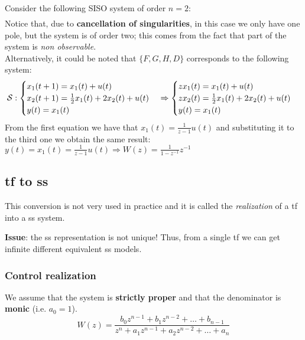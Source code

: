 \begin{exa}{Consider the following SISO system of order $n=2$:}
\begin{align*}
\end{align*}
Notice that, due to \textbf{cancellation of singularities}, in this case we only have one pole, but the system is of order two; this comes from the fact that part of the system is \emph{non observable}.\\
Alternatively, it could be noted that $\{F, G, H, D\}$ corresponds to the following system:
    \[
    \mathcal{S}: 
        \begin{cases}
            x_1(t+1) = x_1(t) + u(t) \\
            x_2(t+1) = \frac{1}{2} x_1(t) + 2x_2(t) + u(t) \\
            y(t) = x_1(t)
        \end{cases}
    \Rightarrow
        \begin{cases}
            zx_1(t) = x_1(t) + u(t) \\
            zx_2(t) = \frac{1}{2} x_1(t) + 2x_2(t) + u(t) \\
            y(t) = x_1(t)
        \end{cases}    
    \]
From the first equation we have that $x_{1}(t)=\frac{1}{z-1}u(t)$ and substituting it to the third one we obtain the same result: $y(t)=x_{1}(t)=\frac{1}{z-1}u(t) \Rightarrow W(z)=\frac{1}{1-z^{-1}} z^{-1}$     

\end{exa}

\subsection{\acrlong{tf} to \acrlong{ss}}
This conversion is not very used in practice and it is called the \emph{realization} of a \acrlong{tf} into a \acrlong{ss} system.

\textbf{Issue}: the \acrlong{ss} representation is not unique! Thus, from a single \acrlong{tf} we can get infinite different equivalent \acrlong{ss} models.

\subsubsection{Control realization}

We assume that the system is \textbf{strictly proper} and that the denominator is \textbf{monic} (i.e. $a_0=1$).
\[ W(z) = \frac{b_0 z^{n-1} + b_1 z^{n-2} + \dots + b_{n-1}}{z^n + a_1 z^{n-1} + a_2 z^{n-2} + \dots + a_n} \]

